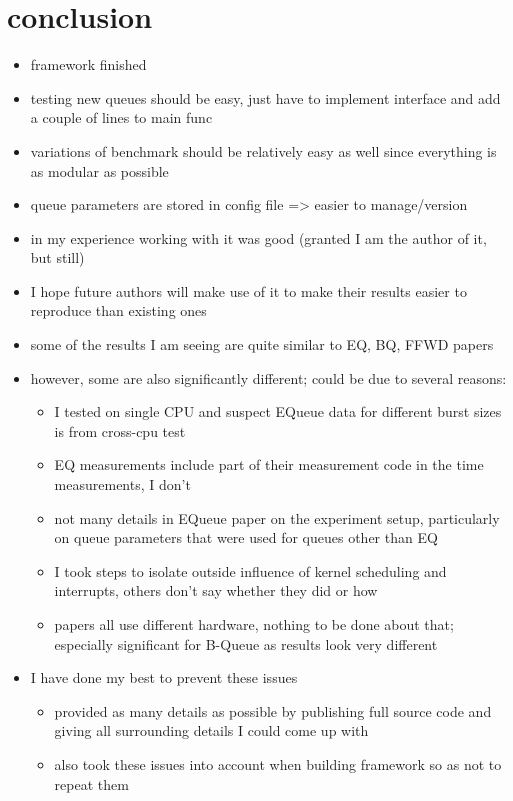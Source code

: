\section{conclusion}
\begin{itemize}
    \item framework finished
    \item testing new queues should be easy, just have to implement interface and add a couple of lines to main func
    \item variations of benchmark should be relatively easy as well since everything is as modular as possible
    \item queue parameters are stored in config file => easier to manage/version
    \item in my experience working with it was good (granted I am the author of it, but still)
    \item I hope future authors will make use of it to make their results easier to reproduce than existing ones

    \item some of the results I am seeing are quite similar to EQ, BQ, FFWD papers
    \item however, some are also significantly different; could be due to several reasons:
        \begin{itemize}
            \item I tested on single CPU and suspect EQueue data for different burst sizes is from cross-cpu test
            \item EQ measurements include part of their measurement code in the time measurements, I don't
            \item not many details in EQueue paper on the experiment setup, particularly on queue parameters
                that were used for queues other than EQ
            \item I took steps to isolate outside influence of kernel scheduling and interrupts, others don't say whether they did or how
            \item papers all use different hardware, nothing to be done about that; especially significant for B-Queue as results look very different 
        \end{itemize}
    \item I have done my best to prevent these issues
        \begin{itemize}
            \item provided as many details as possible by publishing full source code and giving all surrounding details I could come up with
            \item also took these issues into account when building framework so as not to repeat them
        \end{itemize}


\end{itemize}
